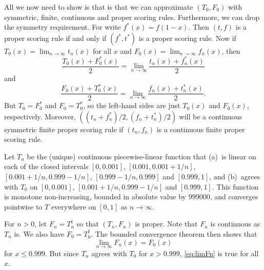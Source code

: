 All we now need to show is that is that we can approximate $(T_0,F_0)$ with symmetric, finite, continuous and proper scoring rules.
Furthermore, we can drop the symmetry requirement. For write $f^*(x)=f(1-x)$. Then $(t,f)$ is a proper scoring rule if and
only if $(f^*,t^*)$ is a proper scoring rule. Now if $T_0(x)=\lim_{n\to\infty} t_n(x)$ for all $x$ and $F_0(x)=\lim_{n\to\infty} f_n(x)$, then
$$
    \frac{T_0(x)+F_0^*(x)}2 = \lim_{n\to\infty} \frac{t_n(x)+f_n^*(x)}2
$$    
    and
$$    
    \frac{F_0(x)+T_0^*(x)}2 = \lim_{n\to\infty} \frac{f_n(x)+t_n^*(x)}2. 
$$    
But $T_0=F^*_0$ and $F_0=T_0^*$, so the left-hand sides are just $T_0(x)$ and $F_0(x)$, respectively. Moreover, $((t_n+f_n^*)/2,(f_n+t_n^*)/2)$  
will be a continuous symmetric finite proper scoring rule if $(t_n,f_n)$ is a continuous finite proper scoring rule.

Let $T_n$ be the (unique) continuous piecewise-linear function that (a)~is linear on each of the closed intervals $[0,0.001]$, $[0.001,0.001+1/n]$, $[0.001+1/n,0.999-1/n]$, $[0.999-1/n,0.999]$ and $[0.999,1]$, and (b)~agrees with
$T_0$ on $[0,0.001]$, $[0.001+1/n,0.999-1/n]$ and $[0.999,1]$. This function is monotone non-increasing, bounded 
in absolute value by $999000$, and converges pointwise to $T$ everywhere on $[0,1]$ as $n\to\infty$.

For $n>0$, let $F_n=T_n^\dag$ so that $(T_n,F_n)$ is proper. Note 
that $F_n$ is continuous as $T_n$ is. We also have $F_0=T_0^\dag$.
The bounded convergence theorem then shows that 
\begin{equation}\label{eq:limFn}
\lim_{n\to\infty} F_n(x) = F_0(x)
\end{equation}
for $x\le 0.999$. But since $T_n$ agrees with $T_0$ for $x>0.999$, \eqref{eq:limFn} is true for all $x$.
\chaptertail 


